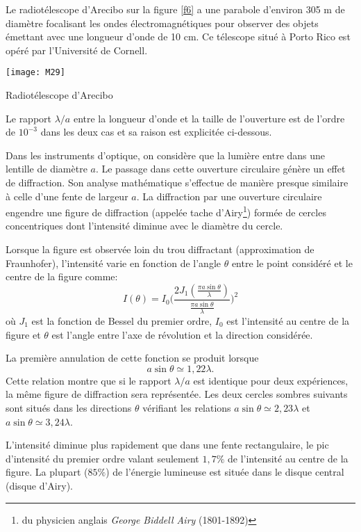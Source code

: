 \noindent Le radiotélescope d'Arecibo sur la figure \ref{f6} a une parabole d'environ 305 m de diamètre focalisant les ondes électromagnétiques pour observer des objets émettant avec une longueur d'onde de 10 cm. Ce télescope situé à Porto Rico est opéré par l'Université de Cornell.

\begin{marginfigure}[-2cm]
\texttt{[image: M29]}
\caption{Radiotélescope d'Arecibo}
\label{f6}
\end{marginfigure}

\noindent Le rapport $\lambda/a$ entre la longueur d'onde et la taille de l'ouverture est de l'ordre de $10^{-3}$ dans les deux cas et sa raison est explicitée ci-dessous.

\noindent Dans les instruments d'optique, on considère que la lumière entre dans une lentille de diamètre $a$. Le passage dans cette ouverture circulaire génère un effet de diffraction. Son analyse mathématique s'effectue de manière presque similaire à celle d'une fente de largeur $a$. La diffraction par une ouverture circulaire engendre une figure de diffraction (appelée tache d'Airy\footnote{du physicien anglais \textit{George Biddell Airy} (1801-1892)}) formée de cercles concentriques dont l'intensité diminue avec le diamètre du cercle. 

\noindent Lorsque la figure est observée loin du trou diffractant (approximation de Fraunhofer), l'intensité varie en fonction de l'angle $\theta$ entre le point considéré et le centre de la figure comme:
$$
    I(\theta)=I_0\bigg(\frac{2J_1(\frac{\pi a\sin\theta}{\lambda})}{\frac{\pi a\sin\theta}{\lambda}}\bigg)^2
$$
où $J_1$ est la fonction de Bessel du premier ordre, $I_0$ est l'intensité au centre de la figure et $\theta$ est l'angle entre l'axe de révolution et la direction considérée.

\noindent La première annulation de cette fonction se produit lorsque 
$$
    a\sin\theta\simeq1,22\lambda.
$$
Cette relation montre que si le rapport $\lambda/a$ est identique pour deux expériences, la même figure de diffraction sera représentée. Les deux cercles sombres suivants sont situés dans les directions $\theta$ vérifiant les relations $a\sin\theta\simeq2,23\lambda$ et $a\sin\theta\simeq3,24\lambda$.

\noindent L'intensité diminue plus rapidement que dans une fente rectangulaire, le pic d'intensité du premier ordre valant seulement $1,7\%$ de l'intensité au centre de la figure. La plupart ($85\%$) de l'énergie lumineuse est située dans le disque central (disque d'Airy).

